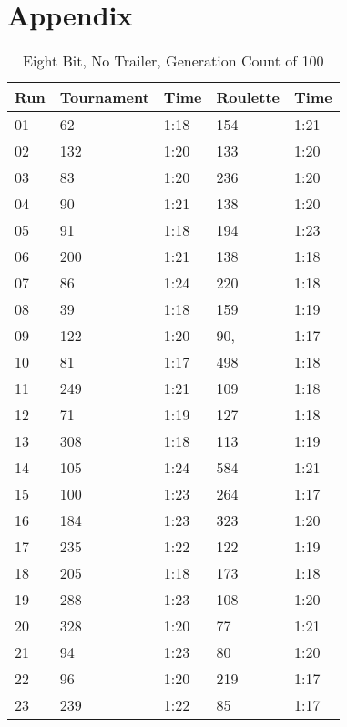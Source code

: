 \chapter{Appendix}
\label{app:appendix}

\begin{center}
	\begin{longtable}{|p{2cm}|l|l|l|l|}
	\caption{Eight Bit, No Trailer, Generation Count of 100}
		\hline
Run     & Tournament& Time    & Roulette & Time \\ \hline
01      & 62  	  & 1:18	&	154    & 1:21 \\ \hline
02      & 132 	  & 1:20	&	133    & 1:20 \\ \hline
03      & 83  	  & 1:20	&	236    & 1:20 \\ \hline
04      & 90  	  & 1:21	&	138    & 1:20 \\ \hline
05      & 91  	  & 1:18	&	194    & 1:23 \\ \hline
06      & 200 	  & 1:21	&	138    & 1:18 \\ \hline
07      & 86  	  & 1:24	&	220    & 1:18 \\ \hline
08      & 39  	  & 1:18	&	159    & 1:19 \\ \hline
09      & 122 	  & 1:20	&	90,    & 1:17 \\ \hline
10      & 81        & 1:17	&	498    & 1:18 \\ \hline
11      & 249 	  & 1:21	&	109    & 1:18 \\ \hline
12      & 71  	  & 1:19	&	127    & 1:18 \\ \hline
13      & 308 	  & 1:18	&	113    & 1:19 \\ \hline
14      & 105 	  & 1:24	&	584    & 1:21 \\ \hline
15      & 100 	  & 1:23	&	264    & 1:17 \\ \hline
16      & 184 	  & 1:23	&	323    & 1:20 \\ \hline
17      & 235 	  & 1:22	&	122    & 1:19 \\ \hline
18      & 205 	  & 1:18	&	173    & 1:18 \\ \hline
19      & 288 	  & 1:23	&	108    & 1:20 \\ \hline
20      & 328 	  & 1:20	&	77     & 1:21 \\ \hline
21      & 94  	  & 1:23	&	80     & 1:20 \\ \hline
22      & 96  	  & 1:20	&	219    & 1:17 \\ \hline
23      & 239 	  & 1:22	&	85     & 1:17 \\ \hline

\end{longtable}
\end{center}
